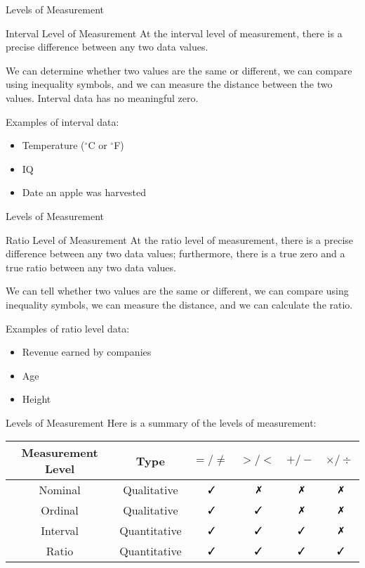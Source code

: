 \documentclass[t]{beamer}
\def\d{^{\circ}}
\newcommand{\?}{\stackrel{?}{=}}
\newcommand{\cmark}{\text{ \ding{51}}}
\newcommand{\xmark}{\text{ \ding{55}}}
\begin{document}
	\begin{frame}{Levels of Measurement}
		\begin{block}{Interval Level of Measurement}
			At the interval level of measurement, there is a precise difference between any two data values.
			
			We can determine whether two values are the same or different, we can compare using inequality symbols, and we can measure the distance between the two values. Interval data has no meaningful zero.
		\end{block} \pause
	
		Examples of interval data: \begin{itemize}
			\item Temperature ($\d$C or $\d$F) \pause
			\item IQ \pause
			\item Date an apple was harvested
		\end{itemize}
	\end{frame}

	\begin{frame}{Levels of Measurement}
		\begin{block}{Ratio Level of Measurement}
			At the ratio level of measurement, there is a precise difference between any two data values; furthermore, there is a true zero and a true ratio between any two data values.
			
			We can tell whether two values are the same or different, we can compare using inequality symbols, we can measure the distance, and we can calculate the ratio.
		\end{block} \pause
	
		Examples of ratio level data: \begin{itemize}
			\item Revenue earned by companies \pause
			\item Age \pause
			\item Height
		\end{itemize}
	\end{frame}

	\begin{frame}{Levels of Measurement}
		Here is a summary of the levels of measurement:
		
		\begin{tabular}{|c|c|c|c|c|c|} \hline
			\textbf{Measurement Level} & \textbf{Type} & \textbf{$=/\neq$} & \textbf{$>/<$} & \textbf{$+/-$} & \textbf{$\times/\div$} \\ \hline
			Nominal & Qualitative & $\cmark$ & $\xmark$ & $\xmark$ & $\xmark$ \\ \hline
			Ordinal & Qualitative & $\cmark$ & $\cmark$ & $\xmark$ & $\xmark$ \\ \hline
			Interval & Quantitative & $\cmark$ & $\cmark$ & $\cmark$ & $\xmark$ \\ \hline
			Ratio & Quantitative & $\cmark$ & $\cmark$ & $\cmark$ & $\cmark$ \\ \hline
		\end{tabular}
	\end{frame}
\end{document}
